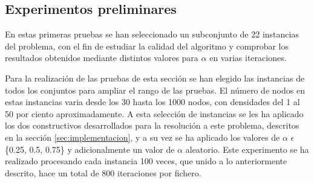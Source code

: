 \subsection{Experimentos preliminares}
En estas primeras pruebas se han seleccionado un subconjunto de 22 instancias del problema, con el fin de estudiar la calidad del algoritmo y comprobar los resultados obtenidos mediante distintos valores para $\alpha$ en varias iteraciones.

Para la realización de las pruebas de esta sección se han elegido las instancias de todos los conjuntos para ampliar el rango de las pruebas. El número de nodos en estas instancias varia desde los 30 hasta los 1000 nodos, con densidades del 1 al 50 por ciento aproximadamente.
A esta selección de instancias se les ha aplicado los dos constructivos desarrollados para la resolución a este problema, descritos en la sección \ref{sec:implementacion}, y a su vez se ha aplicado los valores de $\alpha$ $\epsilon$ \{0.25, 0.5, 0.75\} y adicionalmente un valor de $\alpha$ aleatorio.
Este experimento se ha realizado procesando cada instancia 100 veces, que unido a lo anteriormente descrito, hace un total de 800 iteraciones por fichero.


